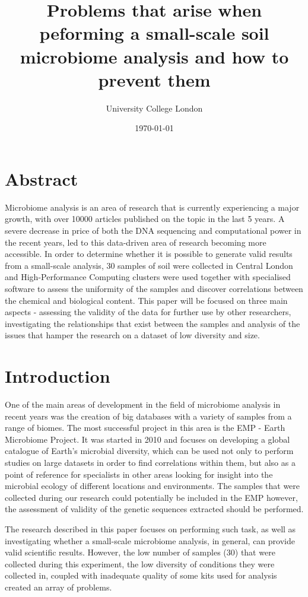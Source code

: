\documentclass[12pt,twocolumn]{article} %
\title{Problems that arise when peforming a small-scale soil microbiome analysis and how to prevent them}
\author{\normalsize University College London \\}
\date{\today}
\begin{document}
	
\maketitle
%
%
\section{Abstract}
Microbiome analysis is an area of research that is currently experiencing a major growth, with over 10000 articles published on the topic in the last 5 years. A severe decrease in price of both the DNA sequencing and computational power in the recent years, led to this data-driven area of research becoming more accessible. In order to determine whether it is possible to generate valid results from a small-scale analysis, 30 samples of soil were collected in Central London and High-Performance Computing clusters were used together with specialised software to assess the uniformity of the samples and discover correlations between the chemical and biological content. This paper will be focused on three main aspects - assessing the validity of the data for further use by other researchers, investigating the relationships that exist between the samples and analysis of the issues that hamper the research on a dataset of low diversity and size.
\section{Introduction}
One of the main areas of development in the field of microbiome analysis in recent years was the creation of big databases with a variety of samples from a range of biomes. The most successful project in this area is the EMP - Earth Microbiome Project\cite{Gilbert2014}. It was started in 2010 and focuses on developing a global catalogue of Earth's microbial diversity, which can be used not only to perform studies on large datasets in order to find correlations within them, but also as a point of reference for specialists in other areas looking for insight into the microbial ecology of different locations and environments. The samples that were collected during our research could potentially be included in the EMP however, the assessment of validity of the genetic sequences extracted should be performed.
\par
The research described in this paper focuses on performing such task, as well as investigating whether a small-scale microbiome analysis, in general, can provide valid scientific results. However, the low number of samples (30) that were collected during this experiment, the low diversity of conditions they were collected in, coupled with inadequate quality of some kits used for analysis created an array of problems. 
\par
%
%
\end{document}
